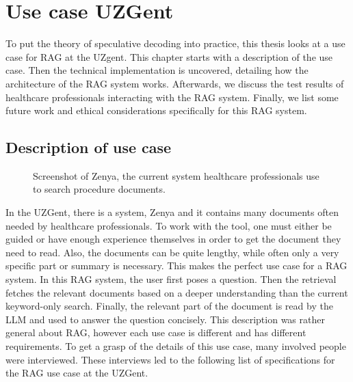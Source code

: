 
\chapter{Use case UZGent}
\label{sec:use_case_uzgent}
To put the theory of speculative decoding into practice, this thesis looks at a use case for RAG at the UZgent. This chapter starts with a description of the use case. Then the technical implementation is uncovered, detailing how the architecture of the RAG system works. Afterwards, we discuss the test results of healthcare professionals interacting with the RAG system. Finally, we list some future work and ethical considerations specifically for this RAG system.

\section{Description of use case}

\begin{figure}[h]
	\centering
	\caption{Screenshot of Zenya, the current system healthcare professionals use to search procedure documents.}
	\label{fig:zenya}
\end{figure}

In the UZGent, there is a system, Zenya and it contains many documents often needed by healthcare professionals. To work with the tool, one must either be guided or have enough experience themselves in order to get the document they need to read. Also, the documents can be quite lengthy, while often only a very specific part or summary is necessary. This makes the perfect use case for a RAG system. In this RAG system, the user first poses a question. Then the retrieval fetches the relevant documents based on a deeper understanding than the current keyword-only search. Finally, the relevant part of the document is read by the LLM and used to answer the question concisely. This description was rather general about RAG, however each use case is different and has different requirements. To get a grasp of the details of this use case, many involved people were interviewed. These interviews led to the following list of specifications for the RAG use case at the UZGent.

